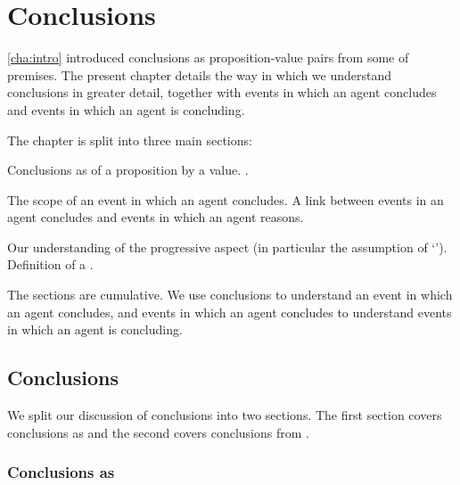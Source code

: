 \chapter{Conclusions}
\label{cha:clar}

\begin{note}
  \autoref{cha:intro} introduced conclusions as proposition-value pairs from some \pool{} of premises.
  The present chapter details the way in which we understand conclusions in greater detail, together with events in which an agent concludes and events in which an agent is concluding.

  The chapter is split into three main sections:

  \begin{TOCEnum}
  \item

    Conclusions as \evalN{} of a proposition by a value. .
  \item

    The scope of an event in which an agent concludes.
    A link between events in an agent concludes and events in which an agent reasons.
  \item

    Our understanding of the progressive aspect (in particular the assumption of `\assuPP{}').
    Definition of a \pevent{}.
  \end{TOCEnum}

  The sections are cumulative.
  We use conclusions to understand an event in which an agent concludes, and events in which an agent concludes to understand events in which an agent is concluding.
\end{note}

\section{Conclusions}
\label{cha:clar:sec:Cons}

\begin{note}
  We split our discussion of conclusions into two sections.
  The first section covers conclusions as  and the second covers conclusions from .
\end{note}

\subsection{Conclusions as }
\label{cha:clar:sec:Cons:pvp}

